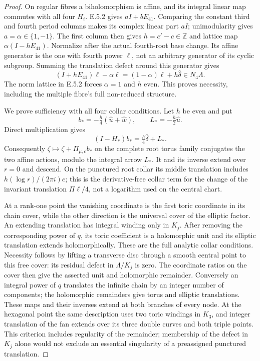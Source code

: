\begin{proof}
On regular fibres a biholomorphism is affine, and its integral
linear map commutes with all four $H_i$.  E.5.2 gives
$aI+bE_{41}$.  Comparing the constant third and fourth
period columns makes its complex linear part $aI$;
unimodularity gives $a=\alpha\in\{1,-1\}$.
The first column then gives $h=c'-c\in\mathbb Z$ and
lattice map $\alpha(I-hE_{41})$.
Normalize after the actual fourth-root base change.  Its
affine generator is the one with fourth power $\ell$, not
an arbitrary generator of its cyclic subgroup.  Summing the
translation defect around this generator gives
\[
 (I+hE_{41})\ell-\alpha\ell
 =(1-\alpha)\ell+h\widehat\delta\in N_4\Lambda.
\]
The norm lattice in E.5.2 forces $\alpha=1$ and $h$ even.
This proves necessity, including the multiple fibre's full
non-reduced structure.

We prove sufficiency with all four collar conditions.
Let $h$ be even and put
\[
 b_*=-\tfrac h4(\widehat u+\widehat w),\qquad
 L_*=-\tfrac h2\widehat u.
\]
Direct multiplication gives
\[
 (I-H_*)b_*=\tfrac h4\widehat\delta+L_*.
\]
Consequently $\zeta\mapsto\zeta+\Pi_{\mu,c}b_*$ on the
complete root torus family conjugates the two affine actions,
modulo the integral arrow $L_*$.  It and its inverse extend
over $r=0$ and descend.  On the punctured root collar its
middle translation includes
$h(\log r)/(2\pi i)e$; this is the derivative-free collar
term for the change of the invariant translation
$\Pi\ell/4$, not a logarithm used on the central chart.

At a rank-one point the vanishing coordinate is the first
toric coordinate in its chain cover, while the other
direction is the universal cover of the elliptic factor.
An extending translation has integral winding only in $K_j$.
After removing the corresponding power of $q$, its toric
coefficient is a holomorphic unit and its elliptic translation
extends holomorphically.  These are the full analytic collar
conditions.  Necessity follows by lifting a transverse disc
through a smooth central point to this free cover: its residual
defect in $\Lambda/K_j$ is zero.  The coordinate ratios on
the cover then give the asserted unit and holomorphic
remainder.  Conversely an integral power of $q$ translates
the infinite chain by an integer number of components;
the holomorphic remainders give torus and elliptic translations.
These maps and their inverses extend at both branches of every
node.  At the hexagonal point the same description uses two
toric windings in $K_3$, and integer translation of the fan
extends over its three double curves and both triple points.
This criterion includes regularity of the remainder; membership
of the defect in $K_j$ alone would not exclude an essential
singularity of a preassigned punctured translation.


\end{proof}

